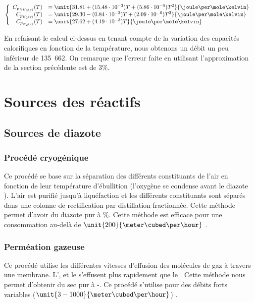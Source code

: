 	$$
	\left\{
		\begin{array}{rl}
			C_{p_{NH_3(g)}}(T) &= \unit{31.81 + (15.48 \cdot 10^{-3})T + (5.86 \cdot 10^{-6})T^2}{\joule\per\mole\kelvin}\\
			C_{p_{H_2(g)}}(T) 	&= \unit{29.30 - (0.84 \cdot 10^{-3})T + (2.09 \cdot 10^{-6})T^2}{\joule\per\mole\kelvin}\\
			C_{p_{N_2(g)}}(T) 	&= \unit{27.62 + (4.19 \cdot 10^{-3})T}{\joule\per\mole\kelvin}
		\end{array}
	\right.
	$$

En refaisant le calcul ci-dessus en tenant compte de la variation des capacités calorifiques en fonction
de la température, nous obtenons un débit un peu inférieur de \unit{135.662}{\liter\per\second}. On remarque
que l'erreur faite en utilisant l'approximation de la section précédente est de 3\%.

\section{Sources des réactifs}
	\subsection{Sources de diazote}
	\subsubsection{Procédé cryogénique}
	Ce procédé se base sur la séparation des différents constituants de l'air en fonction de leur température 
	d'ébullition (l'oxygène  se condense avant le diazote ).
	L'air est purifié jusqu'à liquéfaction et les différents constituants sont séparés dans une colonne de 
	rectification par distillation fractionnée. Cette méthode permet d'avoir du diazote  pur 
	à \%. Cette méthode est efficace pour une consommation au-delà de $\unit{200}{\meter\cubed\per\hour}$ \cite{scf}. 

	\subsubsection{Perméation gazeuse}
	Ce procédé utilise les différentes vitesses d'effusion des molécules de gaz à travers une membrane. 
	L',  et le  s'effusent plus rapidement que le .
	Cette méthode nous permet d'obtenir du  sec pur à -. Ce procédé s'utilise pour des 
	débits forts variables ($\unit{3-1000}{\meter\cubed\per\hour}$) \cite{scf}.

